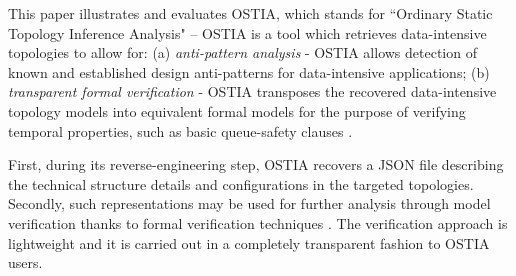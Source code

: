 \documentclass[smallextended]{svjour3}       %
\newcommand{\todoMB}[2]{\linespread{0.7}\todo[color=yellow!50,#1]{\scriptsize\textbf{MB:}#2}}
\begin{document}
This paper illustrates and evaluates OSTIA, which stands for ``Ordinary Static Topology Inference Analysis" -- OSTIA is a tool which retrieves data-intensive topologies to allow for: (a) \emph{anti-pattern analysis} - OSTIA allows detection of known and established design anti-patterns for data-intensive applications; (b) \emph{transparent formal verification} - OSTIA transposes the recovered data-intensive topology models into equivalent formal models for the purpose of verifying temporal properties, such as basic queue-safety clauses \cite{icsoft}. 

First, during its reverse-engineering step, OSTIA recovers a JSON file describing the technical structure details and configurations in the targeted topologies.
%
Secondly, such representations may be used for further analysis through model verification thanks to formal verification techniques \cite{icsoft}. 
The verification approach is lightweight and it is carried out in a completely transparent fashion to OSTIA users.
\end{document}
